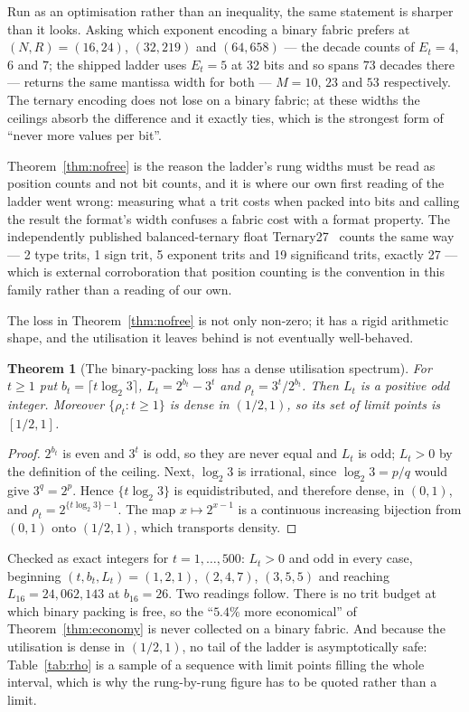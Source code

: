 \documentclass[11pt]{article}
\newtheorem{theorem}{Theorem}
\theoremstyle{definition}
\begin{document}
Run as an optimisation rather than an inequality, the same statement is sharper
than it looks. Asking which exponent encoding a binary fabric prefers at
$(N, R) = (16, 24)$, $(32, 219)$ and $(64, 658)$ --- the decade counts of
$E_t = 4$, $6$ and $7$; the shipped ladder uses $E_t = 5$ at 32 bits and so spans
$73$ decades there --- returns the same mantissa width
for both --- $M = 10$, $23$ and $53$ respectively. The ternary encoding does not
lose on a binary fabric; at these widths the ceilings absorb the difference and it
exactly ties, which is the strongest form of ``never more values per bit''.

Theorem~\ref{thm:nofree} is the reason the ladder's rung widths must be read as
position counts and not bit counts, and it is where our own first reading of the
ladder went wrong: measuring what a trit costs when packed into bits and calling
the result the format's width confuses a fabric cost with a format property. The
independently published balanced-ternary float Ternary27~\cite{ternary27} counts
the same way --- 2 type trits, 1 sign trit, 5 exponent trits and 19 significand
trits, exactly 27 --- which is external corroboration that position counting is
the convention in this family rather than a reading of our own.

The loss in Theorem~\ref{thm:nofree} is not only non-zero; it has a rigid
arithmetic shape, and the utilisation it leaves behind is not eventually
well-behaved.

\begin{theorem}[The binary-packing loss has a dense utilisation spectrum]
\label{thm:packing-density}
For $t\geq1$ put $b_t=\lceil t\log_2 3\rceil$, $L_t=2^{b_t}-3^{t}$ and
$\rho_t=3^{t}/2^{b_t}$. Then $L_t$ is a positive odd integer. Moreover
$\{\rho_t : t\geq1\}$ is dense in $(1/2,1)$, so its set of limit points is
$[1/2,1]$.
\end{theorem}
\begin{proof}
$2^{b_t}$ is even and $3^{t}$ is odd, so they are never equal and $L_t$ is odd;
$L_t>0$ by the definition of the ceiling. Next, $\log_2 3$ is irrational, since
$\log_2 3=p/q$ would give $3^{q}=2^{p}$. Hence $\{t\log_2 3\}$ is
equidistributed, and therefore dense, in $(0,1)$, and
$\rho_t=2^{\{t\log_2 3\}-1}$. The map $x\mapsto2^{x-1}$ is a continuous
increasing bijection from $(0,1)$ onto $(1/2,1)$, which transports density.
\end{proof}

Checked as exact integers for $t=1,\dots,500$: $L_t>0$ and odd in every case,
beginning $(t,b_t,L_t)=(1,2,1)$, $(2,4,7)$, $(3,5,5)$ and reaching
$L_{16}=24{,}062{,}143$ at $b_{16}=26$. Two readings follow. There is no trit
budget at which binary packing is free, so the ``$5.4\%$ more economical'' of
Theorem~\ref{thm:economy} is never collected on a binary fabric. And because the
utilisation is dense in $(1/2,1)$, no tail of the ladder is asymptotically safe:
Table~\ref{tab:rho} is a sample of a sequence with limit points filling the whole
interval, which is why the rung-by-rung figure has to be quoted rather than a
limit.
\end{document}
